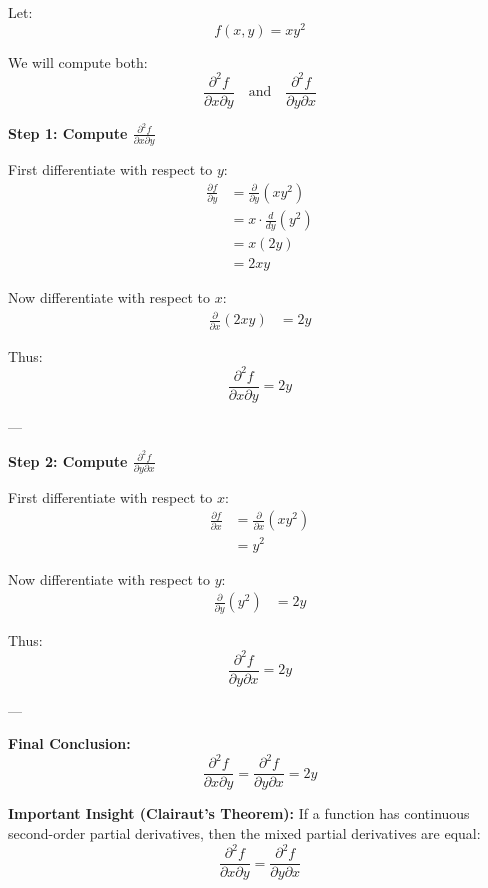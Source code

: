 \begin{examplebox}
    Let:
    \begin{equation*}
        f(x,y) = xy^2
    \end{equation*}

    We will compute both:
    \[
        \frac{\partial^2 f}{\partial x \partial y}
        \quad \text{and} \quad
        \frac{\partial^2 f}{\partial y \partial x}
    \]

    \textbf{Step 1: Compute $\frac{\partial^2 f}{\partial x \partial y}$}

    First differentiate with respect to $y$:
    \begin{align*}
        \frac{\partial f}{\partial y}
         & = \frac{\partial}{\partial y}(xy^2) \\
         & = x \cdot \frac{d}{dy}(y^2)         \\
         & = x(2y)                             \\
         & = 2xy
    \end{align*}

    Now differentiate with respect to $x$:
    \begin{align*}
        \frac{\partial}{\partial x}(2xy)
         & = 2y
    \end{align*}

    Thus:
    \begin{equation*}
        \frac{\partial^2 f}{\partial x \partial y} = 2y
    \end{equation*}

    ---

    \textbf{Step 2: Compute $\frac{\partial^2 f}{\partial y \partial x}$}

    First differentiate with respect to $x$:
    \begin{align*}
        \frac{\partial f}{\partial x}
         & = \frac{\partial}{\partial x}(xy^2) \\
         & = y^2
    \end{align*}

    Now differentiate with respect to $y$:
    \begin{align*}
        \frac{\partial}{\partial y}(y^2)
         & = 2y
    \end{align*}

    Thus:
    \begin{equation*}
        \frac{\partial^2 f}{\partial y \partial x} = 2y
    \end{equation*}

    ---

    \textbf{Final Conclusion:}
    \begin{equation*}
        \frac{\partial^2 f}{\partial x \partial y}
        =
        \frac{\partial^2 f}{\partial y \partial x}
        =
        2y
    \end{equation*}

    \textbf{Important Insight (Clairaut's Theorem):}
    If a function has continuous second-order partial derivatives, then the mixed partial derivatives are equal:
    \[
        \frac{\partial^2 f}{\partial x \partial y}
        =
        \frac{\partial^2 f}{\partial y \partial x}
    \]
\end{examplebox}